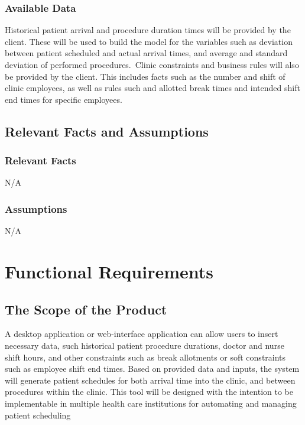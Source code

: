 \documentclass[12pt, titlepage]{article}
\begin{document}
\subsubsection{Available Data}
Historical patient arrival and procedure duration times will be provided by the client. These will be used to build the model for the variables such as deviation between patient scheduled and actual arrival times, and average and standard deviation of performed procedures.\newline\
Clinic constraints and business rules will also be provided by the client. This includes facts such as the number and shift of clinic employees, as well as rules such and allotted break times and intended shift end times for specific employees.
\newline\

\subsection{Relevant Facts and Assumptions} 
\subsubsection{Relevant Facts}
N/A 
\newline
\subsubsection{Assumptions}
N/A

\section{Functional Requirements} 
\subsection{The Scope of the Product}
A desktop application or web-interface application can allow users to insert necessary data, such historical patient procedure durations, doctor and nurse shift hours, and other constraints such as break allotments or soft constraints such as employee shift end times. Based on provided data and inputs, the system will generate patient schedules for both arrival time into the clinic, and between procedures within the clinic. This tool will be designed with the intention to be implementable in multiple health care institutions for automating and managing patient scheduling
\end{document}
